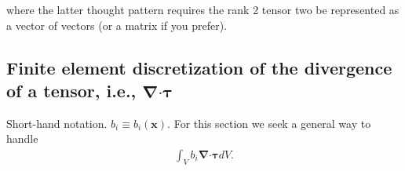 \documentclass[10pt,letterpaper,notitlepage]{article}
\numberwithin{equation}{section}
\newcommand{\bnabla}{\boldsymbol{\nabla}}
\newcommand{\position}{\mathbf{x}}
\newcommand{\dotp}{\boldsymbol{\cdot}}
\newcommand{\beqn}{\begin{equation}\begin{aligned}}
\newcommand{\eeqn}{\end{aligned}\end{equation}}
\begin{document}
\begin{appendices}
where the latter thought pattern requires the rank 2 tensor two be represented as a vector of vectors (or a matrix if you prefer).
\newline
\newline
\subsection{Finite element discretization of the divergence of a tensor, i.e., $\bnabla \dotp \boldsymbol{\tau}$}
Short-hand notation. $b_i \equiv b_i(\position)$. For this section we seek a general way to handle
\beqn 
\int_V b_i \bnabla \dotp \boldsymbol{\tau} dV.
\eeqn


\end{appendices}
\end{document}
